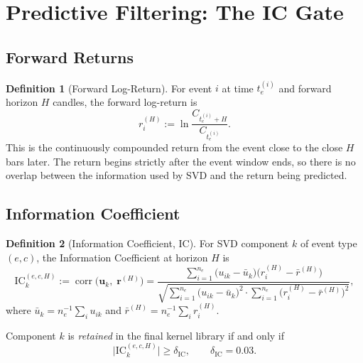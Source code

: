 \documentclass[11pt,a4paper]{article}
\theoremstyle{definition}
\newtheorem{definition}{Definition}[section]
\theoremstyle{plain}
\newcommand{\bvec}[1]{\mathbf{#1}}
\newcommand{\corr}{\operatorname{corr}}
\begin{document}
\section{Predictive Filtering: The IC Gate}
\label{sec:ic}

\subsection{Forward Returns}

\begin{definition}[Forward Log-Return]
\label{def:forward_return}
For event $i$ at time $t_e^{(i)}$ and forward horizon $H$ candles, the forward
log-return is
\begin{equation}
    r_i^{(H)} := \ln\!\frac{C_{t_e^{(i)}+H}}{C_{t_e^{(i)}}}.
    \label{eq:forward_return}
\end{equation}
This is the continuously compounded return from the event close to the close $H$ bars
later. The return begins strictly after the event window ends, so there is no overlap
between the information used by SVD and the return being predicted.
\end{definition}

\subsection{Information Coefficient}

\begin{definition}[Information Coefficient, IC]
\label{def:ic}
For SVD component $k$ of event type $(e, c)$, the Information Coefficient at horizon
$H$ is
\begin{equation}
    \mathrm{IC}_k^{(e,c,H)}
    := \corr\!\bigl(\bvec{u}_k,\; \bvec{r}^{(H)}\bigr)
    = \frac{
        \displaystyle\sum_{i=1}^{n_e}
        \bigl(u_{ik} - \bar{u}_k\bigr)
        \bigl(r_i^{(H)} - \bar{r}^{(H)}\bigr)
      }{
        \sqrt{
          \displaystyle\sum_{i=1}^{n_e}\bigl(u_{ik}-\bar{u}_k\bigr)^2
          \cdot
          \sum_{i=1}^{n_e}\bigl(r_i^{(H)}-\bar{r}^{(H)}\bigr)^2
        }
      },
    \label{eq:ic}
\end{equation}
where $\bar{u}_k = n_e^{-1}\sum_i u_{ik}$ and
$\bar{r}^{(H)} = n_e^{-1}\sum_i r_i^{(H)}$.
\end{definition}

Component $k$ is \emph{retained} in the final kernel library if and only if
\begin{equation}
    \bigl|\mathrm{IC}_k^{(e,c,H)}\bigr| \geq \delta_{\mathrm{IC}},
    \qquad \delta_{\mathrm{IC}} = 0.03.
    \label{eq:ic_gate}
\end{equation}
\end{document}
